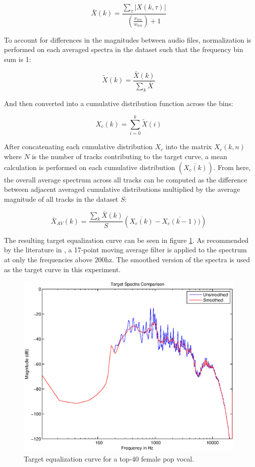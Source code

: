 \documentclass{article}
\begin{document}
\begin{equation}
\bar{X}(k) = \frac{\sum_{\tau}|X(k,\tau)|}{\left(\frac{x_{len}}{w_{len}}\right)+1}
\label{eq:mean_freq}
\end{equation}

To account for differences in the magnitudes between audio files, normalization is performed on each averaged spectra in the dataset such that the frequency bin sum is 1:

\begin{equation}
\tilde{X}(k) = \frac{\bar{X}(k)}{\sum_{k}\bar{X}}
\label{eq:spectra_normalize}
\end{equation}

And then converted into a cumulative distribution function across the bins:

\begin{equation}
X_c(k) = \sum_{i=0}^{k}\tilde{X}(i)
\label{eq:cumulativesum}
\end{equation}

After concatenating each cumulative distribution $X_c$ into the matrix $X_c(k,n)$ where $N$ is the number of tracks contributing to the target curve, a mean calculation is performed on each cumulative distribution $(\overline{X_c(k)})$.  From here, the overall average spectrum across all tracks can be computed as the difference between adjacent averaged cumulative distributions multiplied by the average magnitude of all tracks in the dataset $S$:

\begin{equation}
\bar{X}_{AV}(k) = \frac{\sum_{k}\bar{X}(k)}{S}\left(\overline{X_c(k)}-\overline{X_c(k-1)})\right)
\label{eq:averagespectrum}
\end{equation}

The resulting target equalization curve can be seen in figure \ref{fig:target}.  As recommended by the literature in \cite{ma2013implementation}, a 17-point moving average filter is applied to the spectrum at only the frequencies above 200hz.  The smoothed version of the spectra is used as the target curve in this experiment. 

\begin{figure}[htbp]
\centering
\includegraphics[width=0.9\columnwidth]{targetcurve.eps}
\caption{Target equalization curve for a top-40 female pop vocal.}
\label{fig:target}
\end{figure}
\end{document}
